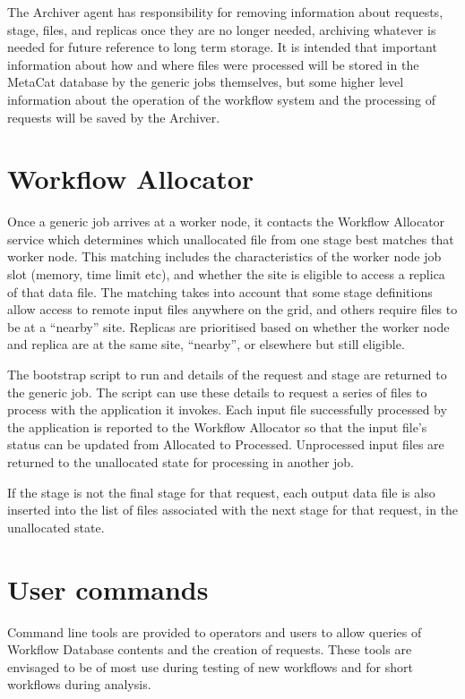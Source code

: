 \documentclass[../main-v1.tex]{subfiles}
\begin{document}
The Archiver agent has responsibility for removing information about requests, stage, files, and replicas once they are no longer needed, archiving whatever is needed for future reference to long term storage. It is intended that important information about how and where files were processed will be stored in the MetaCat database by the generic jobs themselves, but some higher level information about the operation of the workflow system and the processing of requests will be saved by the Archiver.

\section{Workflow Allocator}
\label{sec:flow:allocator}

Once a generic job arrives at a worker node, it contacts the Workflow Allocator service which determines which unallocated file from one stage best matches that worker node. This matching includes the characteristics of the worker node job slot (memory, time limit etc), and whether the site is eligible to access a replica of that data file. The matching takes into account that some stage definitions allow access to remote input files anywhere on the grid, and others require files to be at a ``nearby'' site. Replicas are prioritised based on whether the worker node and replica are at the same site, ``nearby'', or elsewhere but still eligible. 

The bootstrap script to run and details of the request and stage are returned to the generic job. The script can use these details to request a series of files to process with the application it invokes. Each input file successfully processed by the application is reported to the Workflow Allocator so that the input file’s status can be updated from Allocated to Processed. Unprocessed input files are returned to the unallocated state for processing in another job. 

If the stage is not the final stage for that request, each output data file is also inserted into the list of files associated with the next stage for that request, in the unallocated state. 

\section{User commands}
\label{sec:flow:commands}

Command line tools are provided to operators and users to allow queries of Workflow Database contents and the creation of requests. These tools are envisaged to be of most use during testing of new workflows and for short workflows during analysis. 
\end{document}
